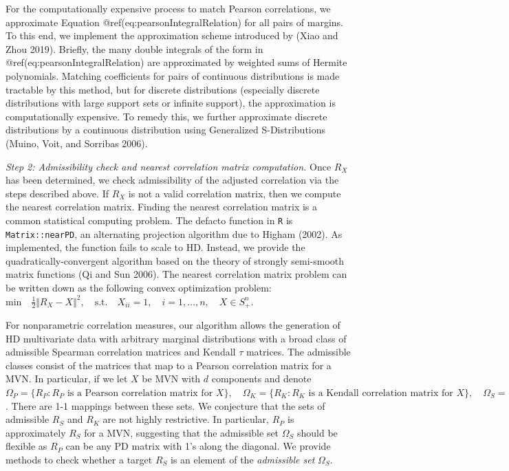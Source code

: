 \documentclass{article}
\begin{document}
For the computationally expensive process to match Pearson correlations,
we approximate Equation @ref(eq:pearsonIntegralRelation) for all pairs
of margins. To this end, we implement the approximation scheme
introduced by (Xiao and Zhou 2019). Briefly, the many double integrals
of the form in @ref(eq:pearsonIntegralRelation) are approximated by
weighted sums of Hermite polynomials. Matching coefficients for pairs of
continuous distributions is made tractable by this method, but for
discrete distributions (especially discrete distributions with large
support sets or infinite support), the approximation is computationally
expensive. To remedy this, we further approximate discrete distributions
by a continuous distribution using Generalized S-Distributions (Muino,
Voit, and Sorribas 2006).

\emph{Step 2: Admissibility check and nearest correlation matrix
computation.} Once \(R_X\) has been determined, we check admissibility
of the adjusted correlation via the steps described above. If \(R_X\) is
not a valid correlation matrix, then we compute the nearest correlation
matrix. Finding the nearest correlation matrix is a common statistical
computing problem. The defacto function in \texttt{R} is
\texttt{Matrix::nearPD}, an alternating projection algorithm due to
Higham (2002). As implemented, the function fails to scale to HD.
Instead, we provide the quadratically-convergent algorithm based on the
theory of strongly semi-smooth matrix functions (Qi and Sun 2006). The
nearest correlation matrix problem can be written down as the following
convex optimization problem:
\(\mathrm{min} \quad \frac{1}{2} \Vert R_X - X \Vert^2, \quad \mathrm{s.t.} \quad X_{ii} = 1, \quad i = 1, \ldots , n, \quad X \in S_{+}^{n}\).

For nonparametric correlation measures, our algorithm allows the
generation of HD multivariate data with arbitrary marginal distributions
with a broad class of admissible Spearman correlation matrices and
Kendall \(\tau\) matrices. The admissible classes consist of the
matrices that map to a Pearson correlation matrix for a MVN. In
particular, if we let \(X\) be MVN with \(d\) components and denote
\(\Omega_P = \{ R_P : R_P \textrm{ is a Pearson correlation matrix for } X \}, \quad \Omega_K = \{ R_K : R_K \textrm{ is a Kendall correlation matrix for } X \}, \quad \Omega_S = \{ R_S : R_S \textrm{ is a Spearman correlation matrix for } X \}\).
There are 1-1 mappings between these sets. We conjecture that the sets
of admissible \(R_S\) and \(R_K\) are not highly restrictive. In
particular, \(R_P\) is approximately \(R_S\) for a MVN, suggesting that
the admissible set \(\Omega_S\) should be flexible as \(R_P\) can be any
PD matrix with 1's along the diagonal. We provide methods to check
whether a target \(R_S\) is an element of the \emph{admissible set}
\(\Omega_S\).
\end{document}
